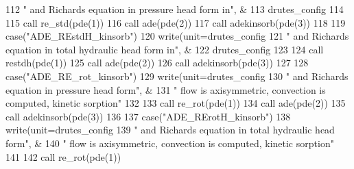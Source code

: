 \begin{DoxyCode}
{{112 \textcolor{comment}{          }\textcolor{stringliteral}{" and Richards equation in pressure head form in"}, &
113            drutes_config%
114 \textcolor{comment}{           }
115 \textcolor{comment}{           }\textcolor{keyword}{call }re_std(pde(1))
116            \textcolor{keyword}{call }ade(pde(2))
117            \textcolor{keyword}{call }adekinsorb(pde(3))
118         
119       \textcolor{keywordflow}{case}(\textcolor{stringliteral}{"ADE\_REstdH\_kinsorb"})
120           \textcolor{keyword}{write}(unit=drutes_config%
121 \textcolor{comment}{          }\textcolor{stringliteral}{" and Richards equation in total hydraulic head form in"}, &
122            drutes_config%
123 \textcolor{comment}{           }
124 \textcolor{comment}{           }\textcolor{keyword}{call }restdh(pde(1))
125            \textcolor{keyword}{call }ade(pde(2))
126            \textcolor{keyword}{call }adekinsorb(pde(3))
127 
128       \textcolor{keywordflow}{case}(\textcolor{stringliteral}{"ADE\_RE\_rot\_kinsorb"})
129           \textcolor{keyword}{write}(unit=drutes_config%
130 \textcolor{comment}{          }\textcolor{stringliteral}{" and Richards equation in pressure head form"}, &
131            \textcolor{stringliteral}{" flow is axisymmetric, convection is computed, kinetic sorption"}\textcolor{comment}{    }
132 \textcolor{comment}{           }
133 \textcolor{comment}{           }\textcolor{keyword}{call }re_rot(pde(1))
134            \textcolor{keyword}{call }ade(pde(2))
135            \textcolor{keyword}{call }adekinsorb(pde(3))
136            
137       \textcolor{keywordflow}{case}(\textcolor{stringliteral}{"ADE\_RErotH\_kinsorb"})
138           \textcolor{keyword}{write}(unit=drutes_config%
139 \textcolor{comment}{          }\textcolor{stringliteral}{" and Richards equation in total hydraulic head form"}, &
140            \textcolor{stringliteral}{" flow is axisymmetric, convection is computed, kinetic sorption"}\textcolor{comment}{    }
141 \textcolor{comment}{           }
142 \textcolor{comment}{           }\textcolor{keyword}{call }re_rot(pde(1))
}}
\end{DoxyCode}
